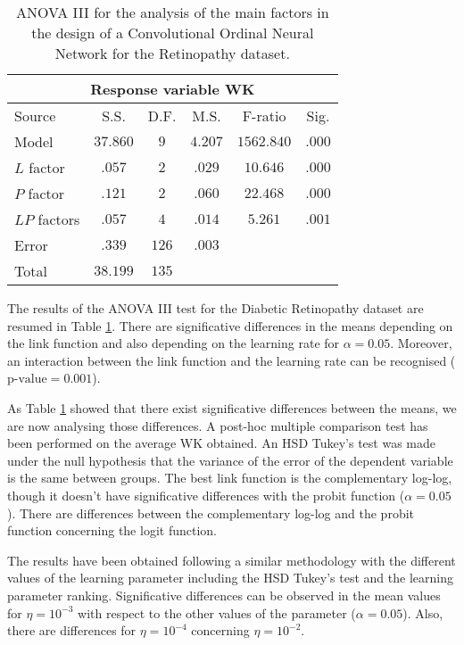 \documentclass[10pt, a4paper, titlepage, twocolumn]{article}
\begin{document}
	\begin{table}[ht]
		\centering
		\small
		\begin{tabular}{l|ccccc}
			\multicolumn{6}{c}{Response variable WK}\\\hline
			Source & S.S. & D.F. & M.S. & F-ratio & Sig.\\\hline
			Model & $37.860$ & $9$ & $4.207$ & $1562.840$ & $.000$\\
			$L$ factor & $.057$ & $2$ & $.029$ & $10.646$ & $.000$\\
			$P$ factor & $.121$ & $2$ & $.060$ & $22.468$ & $.000$\\
			$LP$ factors & $.057$ & $4$ & $.014$ & $5.261$ & $.001$\\
			Error & $.339$ & $126$ & $.003$ & & \\
			Total & $38.199$ & $135$ & & & 
		\end{tabular}
		\caption{ANOVA III for the analysis of the main factors in the design of a Convolutional Ordinal Neural Network for the Retinopathy dataset.}
		\label{table:ANOVARetinopathy}
	\end{table}
	
	The results of the ANOVA III test for the Diabetic Retinopathy dataset are resumed in Table \ref{table:ANOVARetinopathy}. There are significative differences in the means depending on the link function and also depending on the learning rate for $\alpha=0.05$. Moreover, an interaction between the link function and the learning rate can be recognised ($\text{p-value} = 0.001$).
	
	As Table \ref{table:ANOVARetinopathy} showed that there exist significative differences between the means, we are now analysing those differences. A post-hoc multiple comparison test has been performed on the average WK obtained. An HSD Tukey's test was made under the null hypothesis that the variance of the error of the dependent variable is the same between groups. The best link function is the complementary log-log, though it doesn't have significative differences with the probit function ($\alpha=0.05$). There are differences between the complementary log-log and the probit function concerning the logit function.
	
	The results have been obtained following a similar methodology with the different values of the learning parameter including the HSD Tukey's test and the learning parameter ranking. Significative differences can be observed in the mean values for $\eta = 10^{-3}$ with respect to the other values of the parameter ($\alpha=0.05$). Also, there are differences for $\eta = 10^{-4}$ concerning $\eta = 10^{-2}$.
	
\end{document}
